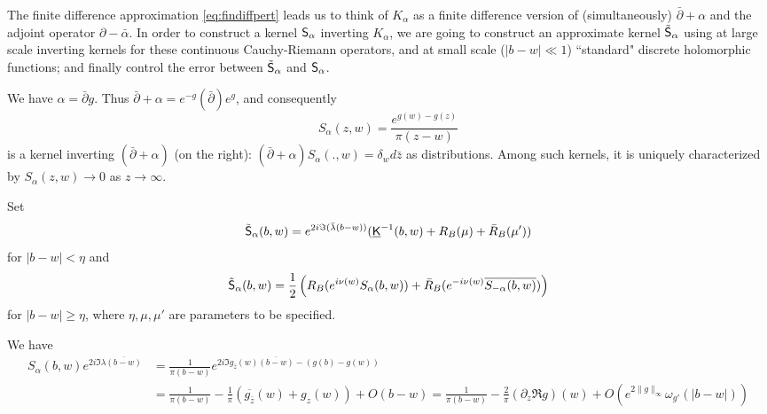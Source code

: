 \documentclass[10pt]{article}
\newcommand{\uK}{{\underline {\sf K}}}
\newcommand{\rS}{{\sf S}}
\newcommand{\dbar}{\bar\partial}
\begin{document}
The finite difference approximation \eqref{eq:findiffpert} leads us to think of $K_\alpha$ as a finite difference version of (simultaneously) $\dbar+\alpha$ and the adjoint operator $\partial-\bar\alpha$. In order to construct a kernel $\rS_\alpha$ inverting $K_\alpha$, we are going to construct an approximate kernel $\tilde\rS_\alpha$ using at large scale inverting kernels for these continuous Cauchy-Riemann operators, and at small scale ($|b-w|\ll1$) ``standard" discrete holomorphic functions; and finally control the error between $\tilde\rS_\alpha$ and $\rS_\alpha$.


We have $\alpha=\dbar g$. Thus $\dbar+\alpha=e^{-g}(\dbar)e^{g}$, and consequently
$$S_\alpha(z,w)=\frac{e^{g(w)-g(z)}}{\pi(z-w)}$$
is a kernel inverting $(\dbar+\alpha)$ (on the right): $(\dbar+\alpha)S_\alpha(.,w)=\delta_wd\bar z$ as distributions. Among such kernels, it is uniquely characterized by $S_\alpha(z,w)\rightarrow 0$ as $z\rightarrow\infty$.

Set 
$$\tilde \rS_\alpha(b,w)=e^{2i\Im(\bar\lambda (b-w))}(\uK^{-1}(b,w)+R_B(\mu)+\bar R_B(\mu'))$$ 
for $|b-w|<\eta$ and
\begin{equation}\label{eq:planekerasymp}
\tilde \rS_\alpha(b,w)=\frac 12 \left(R_B(e^{i\nu(w)}S_\alpha(b,w))+\bar R_B(e^{-i\nu(w)}\overline {S_{-\alpha}(b,w)})\right)
\end{equation}
for $|b-w|\geq\eta$, where $\eta,\mu,\mu'$ are parameters to be specified.

We have
\begin{align*}
S_\alpha(b,w)e^{2i\Im\lambda\overline{(b-w)}}&=\frac{1}{\pi(b-w)}e^{2i\Im g_{\bar z}(w)\overline{(b-w)}-(g(b)-g(w))}\\
&=\frac{1}{\pi(b-w)}-\frac{1}\pi(\overline {g_{\bar z}}(w)+g_z(w))+O(b-w)
=\frac{1}{\pi(b-w)}-\frac{2}{\pi}(\partial_z\Re g)(w)+O(e^{2\|g\|_\infty}\omega_{g'}(|b-w|))
\end{align*}

%
%
%
%
%
\end{document}
